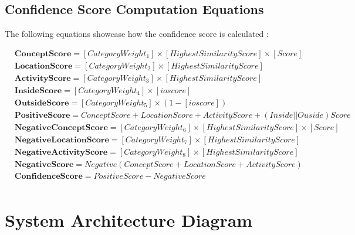 \newpage
\subsection{Confidence Score Computation Equations}
\label{sec:equation}
The following equations showcase how the confidence score is calculated :






\begin{align*}
    &\textbf{ConceptScore}  =   [CategoryWeight_1]\times[HighestSimilarityScore]\times[Score] \\ 
    &\textbf{LocationScore} = [CategoryWeight_2]\times[HighestSimilarityScore] \\ 
   &\textbf{ActivityScore} =  [CategoryWeight_3]\times[HighestSimilarityScore]\\
    &\textbf{InsideScore}   =  [CategoryWeight_4]\times[ioscore]\\
    &\textbf{OutsideScore}  =  [CategoryWeight_5]\times(1-[ioscore])\\
    &\textbf{PositiveScore}  =  ConceptScore + LocationScore + ActivityScore + (Inside||Ouside)Score\\
    &\textbf{NegativeConceptScore}  =  [CategoryWeight_6]\times[HighestSimilarityScore]\times[Score]\\
    &\textbf{NegativeLocationScore}  =  [CategoryWeight_7]\times[HighestSimilarityScore]\\
    &\textbf{NegativeActivityScore}  =  [CategoryWeight_8]\times[HighestSimilarityScore]\\
    &\textbf{NegativeScore}  =  Negative(ConceptScore + LocationScore + ActivityScore) \\
    &\textbf{ConfidenceScore}  =  PositiveScore - NegativeScore\\
\end{align*}





\newpage


\section{System Architecture Diagram}
\label{sec:diagram}
   

